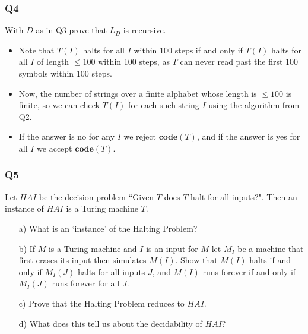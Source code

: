 \documentclass[handout]{beamer}
\newcommand{\co}{\mathbf{code}}
\begin{document}
\begin{frame}
\frametitle{Q4}
With $D$ as in Q3 prove that $L_D$ is recursive. 
\vspace{0.5cm}
\begin{itemize}
\item Note that $T(I)$ halts for all $I$ within 100 steps if and only if $T(I)$ halts for all $I$ of length $\leq 100$ within 100 steps, as $T$ can never read past the first 100 symbols within 100 steps. 
\vspace{0.3cm}
\item Now, the number of strings over a finite alphabet whose length is $\leq 100$ is finite, so we can check $T(I)$ for each such string $I$ using the algorithm from Q2. 
\vspace{0.3cm}
\item If the answer is no for any $I$ we reject $\co(T)$, and if the answer is yes for all $I$ we accept $\co(T)$.
\end{itemize}
\end{frame}

\begin{frame}
\frametitle{Q5}
Let $HAI$ be the decision problem ``Given $T$ does $T$ halt for all inputs?". Then an instance of $HAI$ is a Turing machine $T$.\vspace{0.3cm}
\begin{enumerate}
\item[a)] What is an `instance' of the Halting Problem?\vspace{0.3cm}
\item[b)] If $M$ is a Turing machine and $I$ is an input for $M$ let $M_I$ be a machine that first erases its input then simulates $M(I)$. Show that $M(I)$ halts if and only if $M_I(J)$ halts for all inputs $J$, and $M(I)$ runs forever if and only if $M_I(J)$ runs forever for all $J$.\vspace{0.3cm}
\item[c)] Prove that the Halting Problem reduces to $HAI$.\vspace{0.3cm}
\item[d)] What does this tell us about the decidability of $HAI$?
\end{enumerate}
\end{frame}
\end{document}
